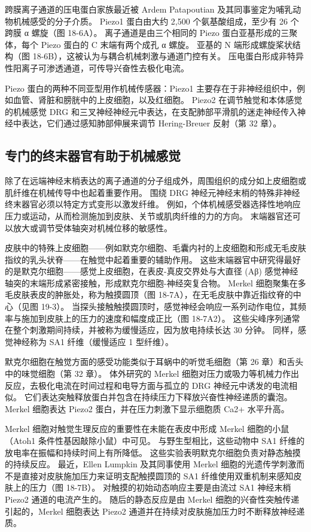跨膜离子通道的压电蛋白家族最近被 Ardem Patapoutian 及其同事鉴定为哺乳动物机械感受的分子介质。 Piezo1 蛋白由大约 2,500 个氨基酸组成，至少有 26 个跨膜 α 螺旋（图 18-6A）。 离子通道是由三个相同的 Piezo 蛋白亚基形成的三聚体，每个 Piezo 蛋白的 C 末端有两个成孔 α 螺旋。 亚基的 N 端形成螺旋桨状结构（图 18-6B），这被认为与耦合机械刺激与通道门控有关。 压电蛋白形成非特异性阳离子可渗透通道，可传导兴奋性去极化电流。

Piezo 蛋白的两种不同亚型用作机械传感器：Piezo1 主要存在于非神经组织中，例如血管、肾脏和膀胱中的上皮细胞，以及红细胞。 Piezo2 在调节触觉和本体感觉的机械感觉 DRG 和三叉神经神经元中表达，在支配肺部平滑肌的迷走神经传入神经中表达，它们通过感知肺部伸展来调节 Hering-Breuer 反射（第 32 章）。

\subsection{专门的终末器官有助于机械感觉}
除了在远端神经末梢表达的离子通道的分子组成外，周围组织的成分如上皮细胞或肌纤维在机械传导中也起着重要作用。 围绕 DRG 神经元神经末梢的特殊非神经终末器官必须以特定方式变形以激发纤维。 例如，个体机械感受器选择性地响应压力或运动，从而检测施加到皮肤、关节或肌肉纤维的力的方向。 末端器官还可以放大或调节受体轴突对机械位移的敏感性。

皮肤中的特殊上皮细胞——例如默克尔细胞、毛囊内衬的上皮细胞和形成无毛皮肤指纹的乳头状脊——在触觉中起着重要的辅助作用。 这些末端器官中研究得最好的是默克尔细胞——感觉上皮细胞，在表皮-真皮交界处与大直径 (Aβ) 感觉神经轴突的末端形成紧密接触，形成默克尔细胞-神经突复合物。 Merkel 细胞聚集在多毛皮肤表皮的肿胀处，称为触摸圆顶（图 18-7A），在无毛皮肤中靠近指纹脊的中心（见图 19-3）。 当探头接触触摸圆顶时，感觉神经会响应一系列动作电位，其频率与施加到皮肤上的压力的速度和幅度成正比（图 18-7A2）。 这些尖峰序列通常在整个刺激期间持续，并被称为缓慢适应，因为放电持续长达 30 分钟。 同样，感觉神经称为 SA1 纤维（缓慢适应 1 型纤维）。

默克尔细胞在触觉方面的感受功能类似于耳蜗中的听觉毛细胞（第 26 章）和舌头中的味觉细胞（第 32 章）。 体外研究的 Merkel 细胞对压力或吸力等机械力作出反应，去极化电流在时间过程和电导方面与孤立的 DRG 神经元中诱发的电流相似。 它们表达突触释放蛋白并包含在持续压力下释放兴奋性神经递质的囊泡。 Merkel 细胞表达 Piezo2 蛋白，并在压力刺激下显示细胞质 Ca2+ 水平升高。

Merkel 细胞对触觉生理反应的重要性在未能在表皮中形成 Merkel 细胞的小鼠（Atoh1 条件性基因敲除小鼠）中可见。 与野生型相比，这些动物中 SA1 纤维的放电率在振幅和持续时间上有所降低。 这些实验表明默克尔细胞负责对静态触摸的持续反应。 最近，Ellen Lumpkin 及其同事使用 Merkel 细胞的光遗传学刺激而不是直接对皮肤施加压力来证明支配触摸圆顶的 SA1 纤维使用双重机制来感知皮肤上的压力（图 18-7B）。 对触摸的初始动态响应主要是由流过 SA1 神经末梢 Piezo2 通道的电流产生的。 随后的静态反应是由 Merkel 细胞的兴奋性突触传递引起的，Merkel 细胞表达 Piezo2 通道并在持续对皮肤施加压力时不断释放神经递质。

